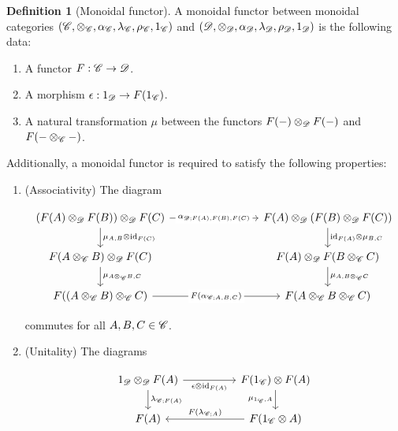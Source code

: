 \documentclass{article}
\theoremstyle{definition}
\newtheorem*{definition}{Definition}
\numberwithin{figure}{section}
\begin{document}
\begin{definition}[Monoidal functor] A monoidal functor between monoidal categories $(\mathscr{C},\otimes_{\mathscr{C}}, \alpha_{\mathscr{C}},\lambda_{\mathscr{C}},\rho_{\mathscr{C}},1_{\mathscr{C}})$ and $(\mathscr{D},\otimes_{\mathscr{D}},\alpha_{\mathscr{D}},\lambda_{\mathscr{D}},\rho_{\mathscr{D}},1_{\mathscr{D}})$ is the following data:

\begin{enumerate}
\item A functor $F: \mathscr{C}\to \mathscr{D}$.
\item A morphism $\epsilon:1_{\mathscr{D}}\to F(1_{\mathscr{C}})$.
\item A natural transformation $\mu$ between the functors $F(\--)\otimes_{\mathscr{D}}F(\--)$ and $F(\--\otimes_{\mathscr{C}}\--)$.
\end{enumerate}

Additionally, a monoidal functor is required to satisfy the following properties:

\begin{enumerate}
\item (Associativity) The diagram

\[\begin{tikzcd}
	{(F(A)\otimes_{\Dcat}F(B))\otimes_{\Dcat}F(C)} &&& {F(A)\otimes_{\Dcat}(F(B)\otimes_{\Dcat}F(C))} \\
	{F(A\otimes_{\Ccat}B)\otimes_{\Dcat}F(C)} &&& {F(A)\otimes_{\Dcat}F(B\otimes_{\Ccat}C)} \\
	{F((A\otimes_{\Ccat} B)\otimes_{\Ccat}C)} && {} & {F(A\otimes_{\Ccat}B\otimes_{\Ccat}C)}
	\arrow["{\mu_{A,B}\otimes \id_{F(C)}}", from=1-1, to=2-1]
	\arrow["{\mu_{A\otimes_{\Ccat}B,C}}", from=2-1, to=3-1]
	\arrow["{\mu_{A,B\otimes_{\Ccat}C}}", from=2-4, to=3-4]
	\arrow["{\id_{F(A)}\otimes\mu_{B,C}}", from=1-4, to=2-4]
	\arrow["{F(\alpha_{\Ccat;A,B,C})}"{description}, from=3-1, to=3-4]
	\arrow["{\alpha_{\Dcat;F(A),F(B),F(C)}}"{description}, from=1-1, to=1-4]
\end{tikzcd}\]

commutes for all $A,B,C\in \mathscr{C}$.

\item (Unitality) The diagrams

\[\begin{tikzcd}
	{1_{\Dcat}\otimes_{\Dcat}F(A)} && {F(1_{\Ccat})\otimes F(A)} \\
	{F(A)} && {F(1_{\Ccat}\otimes A)}
	\arrow["{\lambda_{\Ccat;F(A)}}", from=1-1, to=2-1]
	\arrow["{F(\lambda_{\Ccat;A})}"', from=2-3, to=2-1]
	\arrow["{\mu_{1_{\Ccat},A}}"', from=1-3, to=2-3]
	\arrow["{\epsilon\otimes \id_{F(A)}}"', from=1-1, to=1-3]
\end{tikzcd}\]


\end{enumerate}
\end{definition}
\end{document}
